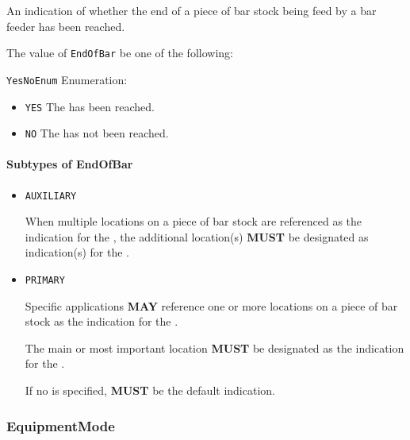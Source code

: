 An indication of whether the end of a piece of bar stock being feed by a bar feeder has been reached.


The value of \texttt{EndOfBar} \MUST be one of the following: 


\texttt{YesNoEnum} Enumeration:

\begin{itemize}
\item \texttt{YES} \newline The  has been reached. 
\item \texttt{NO} \newline The  has not been reached. 
\end{itemize}


\paragraph{Subtypes of EndOfBar}\mbox{}
\label{sec:Subtypes of EndOfBar}

\begin{itemize}

\item \texttt{AUXILIARY}


When multiple locations on a piece of bar stock are referenced as the indication for the , the additional location(s) \textbf{MUST} be designated as  indication(s) for the .  

\item \texttt{PRIMARY}


Specific applications \textbf{MAY} reference one or more locations on a piece of bar stock as the indication for the . 

The main or most important location \textbf{MUST} be designated as the  indication for the .

If no  is specified,  \textbf{MUST} be the default  indication.


\end{itemize}





\subsubsection{EquipmentMode}
\label{sec:EquipmentMode}



